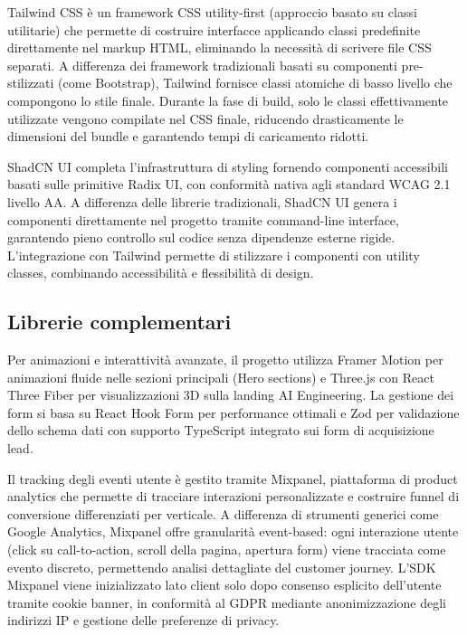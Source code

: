Tailwind CSS è un framework CSS utility-first (approccio basato su classi 
utilitarie) che permette di costruire interfacce applicando classi predefinite 
direttamente nel markup HTML, eliminando la necessità di scrivere file CSS 
separati. A differenza dei framework tradizionali basati su componenti 
pre-stilizzati (come Bootstrap), Tailwind fornisce classi atomiche di basso 
livello che compongono lo stile finale. Durante la fase di build, solo le 
classi effettivamente utilizzate vengono compilate nel CSS finale, riducendo 
drasticamente le dimensioni del bundle e garantendo tempi di caricamento ridotti.

ShadCN UI completa l'infrastruttura di styling fornendo componenti accessibili 
basati sulle primitive Radix UI, con conformità nativa agli standard WCAG 2.1 
livello AA. A differenza delle librerie tradizionali, ShadCN UI genera i 
componenti direttamente nel progetto tramite command-line interface, garantendo 
pieno controllo sul codice senza dipendenze esterne rigide. L'integrazione con 
Tailwind permette di stilizzare i componenti con utility classes, combinando 
accessibilità e flessibilità di design.

\subsection{Librerie complementari}

Per animazioni e interattività avanzate, il progetto utilizza Framer Motion per 
animazioni fluide nelle sezioni principali (Hero sections) e Three.js con React 
Three Fiber per visualizzazioni 3D sulla landing AI Engineering. La gestione dei 
form si basa su React Hook Form per performance ottimali e Zod per validazione 
dello schema dati con supporto TypeScript integrato sui form di acquisizione lead.

Il tracking degli eventi utente è gestito tramite Mixpanel, piattaforma di 
product analytics che permette di tracciare interazioni personalizzate e 
costruire funnel di conversione differenziati per verticale. A differenza di 
strumenti generici come Google Analytics, Mixpanel offre granularità event-based: 
ogni interazione utente (click su call-to-action, scroll della pagina, apertura 
form) viene tracciata come evento discreto, permettendo analisi dettagliate del 
customer journey. L'SDK Mixpanel viene inizializzato lato client solo dopo 
consenso esplicito dell'utente tramite cookie banner, in conformità al GDPR 
mediante anonimizzazione degli indirizzi IP e gestione delle preferenze di 
privacy.


